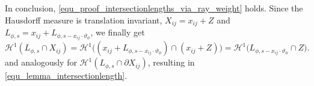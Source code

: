 \documentclass[11pt,reqno]{amsart}
\numberwithin{theorem}{section}
\theoremstyle{remark}
\begin{document}
In conclusion, \eqref{equ_proof_intersectionlengths_via_ray_weight} holds.
Since the Hausdorff measure is translation invariant, $X_{ij}=x_{ij}+Z$ and $L_{\phi,s}= x_{ij}+L_{\phi,s-x_{ij}\cdot\vartheta_\phi}$, we finally get
\begin{equation}
    \mathcal{H}^1(L_{\phi,s}\cap X_{ij})= \mathcal{H}^1\big((x_{ij}+L_{\phi,s-x_{ij}\cdot \vartheta_\phi})\cap (x_{ij}+Z )\big)
    =\mathcal{H}^1\big(L_{\phi,s-x_{ij}\cdot \vartheta_\phi}\cap Z \big)
    .
\end{equation}
and analogously for $\mathcal{H}^1(L_{\phi,s}\cap \partial X_{ij})$, resulting in \eqref{equ_lemma_intersectionlength}.


\begin{figure}
\newcommand{\myheight}{3}
\newcommand{\mydepth}{0.3}

\center
\newcommand{\figursize}{1.1}
\end{figure}
\end{document}
